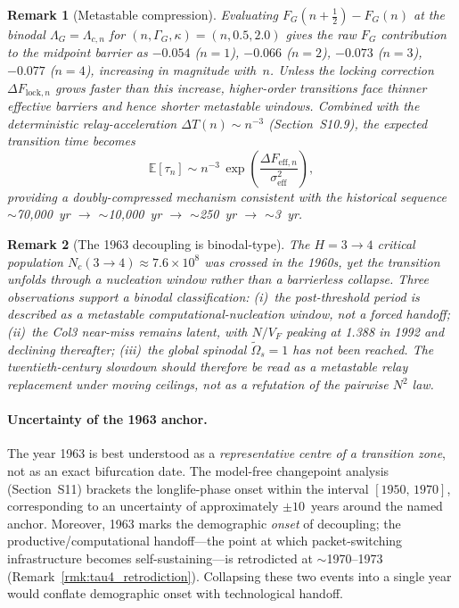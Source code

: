 \documentclass[11pt]{article}
\newtheorem{remark}{Remark}
\begin{document}
\begin{remark}[Metastable compression]
Evaluating $F_G(n+\tfrac{1}{2}) - F_G(n)$ at the binodal
$\Lambda_G = \Lambda_{c,n}$ for $(n,\Gamma_G,\kappa)=(n,0.5,2.0)$ gives
the raw $F_G$ contribution to the midpoint barrier as
$-0.054$ ($n{=}1$), $-0.066$ ($n{=}2$), $-0.073$ ($n{=}3$),
$-0.077$ ($n{=}4$),
\emph{increasing in magnitude} with~$n$.
Unless the locking correction $\Delta F_{\mathrm{lock},n}$ grows
faster than this increase, higher-order transitions face thinner
effective barriers and hence shorter metastable windows.
Combined with the deterministic relay-acceleration
$\Delta T(n) \sim n^{-3}$ (Section~S10.9), the expected
transition time becomes
\[
\mathbb{E}[\tau_n]
\sim n^{-3}\,\exp\!\left(\frac{\Delta F_{\mathrm{eff},n}}
  {\sigma_{\mathrm{eff}}^2}\right),
\]
providing a doubly-compressed mechanism consistent with the
historical sequence
$\sim$70{,}000~yr $\to$ $\sim$10{,}000~yr $\to$ $\sim$250~yr $\to$ $\sim$3~yr.
\end{remark}

\begin{remark}[The 1963 decoupling is binodal-type]
\label{rmk:binodal_1963}
The $H = 3 \to 4$ critical population
$N_c(3\!\to\!4) \approx 7.6\times 10^8$ was crossed in the 1960s,
yet the transition unfolds through a nucleation window rather than a
barrierless collapse.  Three observations support a binodal
classification: (i)~the post-threshold period is described as a
metastable computational-nucleation window, not a forced handoff;
(ii)~the Col3 near-miss remains latent, with $N/V_F$ peaking at 1.388
in 1992 and declining thereafter; (iii)~the global spinodal
$\tilde\Omega_s = 1$ has not been reached.
The twentieth-century slowdown should therefore be read as a
metastable relay replacement under moving ceilings, not as a
refutation of the pairwise $N^2$ law.
\end{remark}

\paragraph{Uncertainty of the 1963 anchor.}
The year 1963 is best understood as a \emph{representative centre of a
transition zone}, not as an exact bifurcation date.
The model-free changepoint analysis (Section~S11) brackets the
longlife-phase onset within the interval $[1950,\,1970]$,
corresponding to an uncertainty of approximately $\pm 10$~years around
the named anchor.
Moreover, 1963 marks the demographic \emph{onset} of decoupling;
the productive/computational handoff---the point at which
packet-switching infrastructure becomes self-sustaining---is
retrodicted at $\sim$1970--1973 (Remark~\ref{rmk:tau4_retrodiction}).
Collapsing these two events into a single year would conflate
demographic onset with technological handoff.
\end{document}
